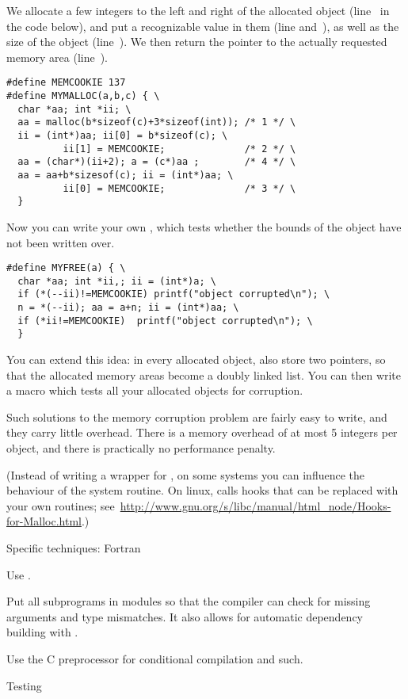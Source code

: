 We allocate a few integers to the left and right of the
allocated object (line~ in the code below), 
and put a recognizable value in them (line  and~), as well as the
size of the object (line~). We then return the pointer to the
actually requested memory area (line~).
\begin{verbatim}
#define MEMCOOKIE 137
#define MYMALLOC(a,b,c) { \
  char *aa; int *ii; \
  aa = malloc(b*sizeof(c)+3*sizeof(int)); /* 1 */ \
  ii = (int*)aa; ii[0] = b*sizeof(c); \
          ii[1] = MEMCOOKIE;              /* 2 */ \
  aa = (char*)(ii+2); a = (c*)aa ;        /* 4 */ \
  aa = aa+b*sizesof(c); ii = (int*)aa; \
          ii[0] = MEMCOOKIE;              /* 3 */ \
  }
\end{verbatim}
Now you can write your own \n{free}, which tests whether the bounds of
the object have not been written over.
\begin{verbatim}
#define MYFREE(a) { \
  char *aa; int *ii,; ii = (int*)a; \
  if (*(--ii)!=MEMCOOKIE) printf("object corrupted\n"); \
  n = *(--ii); aa = a+n; ii = (int*)aa; \
  if (*ii!=MEMCOOKIE)  printf("object corrupted\n"); \
  }
\end{verbatim}
You can extend this idea: in every allocated object, also store two
pointers, so that the allocated memory areas become a doubly linked
list. You can then write a macro  which tests all your
allocated objects for corruption.

Such solutions to the memory corruption problem are fairly easy to
write, and they carry little overhead. There is a memory overhead of
at most 5 integers per object, and there is practically no performance
penalty.

(Instead of writing a wrapper for , on some systems you can
influence the behaviour of the system routine. On linux, \n{malloc}
calls hooks that can be replaced with your own routines;
see~\url{http://www.gnu.org/s/libc/manual/html_node/Hooks-for-Malloc.html}.)

\Level 1 {Specific techniques: Fortran}

Use .

Put all subprograms in modules so that the compiler can check for
missing arguments and type mismatches. It also allows for automatic
dependency building with .

Use the C preprocessor for conditional compilation and such.

\Level 0 {Testing}

